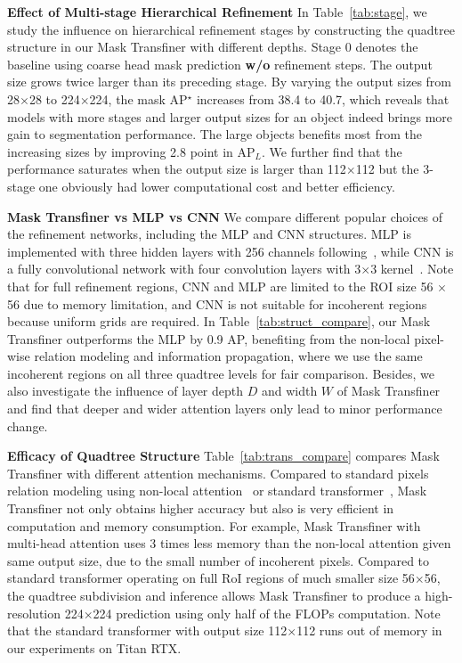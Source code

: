 \documentclass[10pt,twocolumn,letterpaper]{article}
\newcommand{\parsection}[1]{\vspace{1mm}\noindent\textbf{#1}}
\begin{document}
\parsection{Effect of Multi-stage Hierarchical Refinement} 
In Table~\ref{tab:stage}, we study the influence on hierarchical refinement stages by constructing the quadtree structure in our Mask Transfiner with different depths. Stage 0 denotes the baseline using coarse head mask prediction \textbf{w/o} refinement steps. The output size grows twice larger than its preceding stage. By varying the output sizes from 28$\times$28 to 224$\times$224, the mask AP$^\star$ increases from 38.4 to 40.7, which reveals that models with more stages and larger output sizes for an object indeed brings more gain to segmentation performance. The large objects benefits most from the increasing sizes by improving 2.8 point in AP$_L$. We further find that the performance saturates when the output size is larger than 112$\times$112 but the 3-stage one obviously had lower computational cost and better efficiency. 

\parsection{Mask Transfiner vs MLP vs CNN}
We compare different popular choices of the refinement networks, including the MLP and CNN structures. MLP is implemented with three hidden layers with 256 channels following~\cite{kirillov2020pointrend}, while CNN is a fully convolutional network with four convolution layers with 3$\times$3 kernel~\cite{he2017mask}.
Note that for full refinement regions, CNN and MLP are limited to the ROI size 56 $\times$ 56 due to memory limitation, and CNN is not suitable for incoherent regions because uniform grids are required.
In Table~\ref{tab:struct_compare}, our Mask Transfiner outperforms the MLP by 0.9 AP, benefiting from the non-local pixel-wise relation modeling and information propagation, where we use the same incoherent regions on all three quadtree levels for fair comparison.
Besides, we also investigate the influence of layer depth $D$ and width $W$ of Mask Transfiner and find that deeper and wider attention layers only lead to minor performance change.


\parsection{Efficacy of Quadtree Structure} 
Table~\ref{tab:trans_compare} compares Mask Transfiner with different attention mechanisms. Compared to standard pixels relation modeling using non-local attention~\cite{wang2018non} or standard transformer~\cite{carion2020end}, Mask Transfiner not only obtains higher accuracy but also is very efficient in computation and memory consumption. For example, Mask Transfiner with multi-head attention uses 3 times less memory than the non-local attention given  same output size, due to the small number of incoherent pixels. Compared to standard transformer operating on full RoI regions of much smaller size 56$\times$56, the quadtree subdivision and inference allows Mask Transfiner to produce a high-resolution 224$\times$224 prediction using only half of the FLOPs computation. Note that the standard transformer with output size 112$\times$112 runs out of memory in our experiments on Titan RTX.
\end{document}

